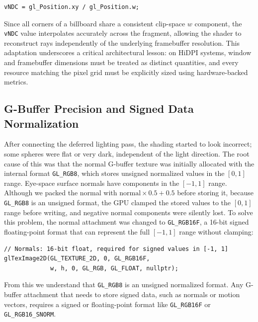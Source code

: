 \documentclass[12pt, a4paper]{article}
\begin{document}
\begin{lstlisting}[style=glslstyle]
vNDC = gl_Position.xy / gl_Position.w;
\end{lstlisting}

Since all corners of a billboard share a consistent clip-space $w$ component, the \texttt{vNDC} value interpolates accurately across the fragment, allowing the shader to reconstruct rays independently of the underlying framebuffer resolution. This adaptation underscores a critical architectural lesson: on HiDPI systems, window and framebuffer dimensions must be treated as distinct quantities, and every resource matching the pixel grid must be explicitly sized using hardware-backed metrics.
\subsection{G-Buffer Precision and Signed Data Normalization}

After connecting the deferred lighting pass, the shading started to look incorrect; some spheres were flat or very dark, independent of the light direction. The root cause of this was that the normal G-buffer texture was initially allocated with the internal format \texttt{GL\_RGB8}, which stores unsigned normalized values in the $[0, 1]$ range. Eye-space surface normals have components in the $[-1, 1]$ range. Although we packed the normal with $\text{normal} \times 0.5 + 0.5$ before storing it, because \texttt{GL\_RGB8} is an unsigned format, the GPU clamped the stored values to the $[0, 1]$ range before writing, and negative normal components were silently lost. To solve this problem, the normal attachment was changed to \texttt{GL\_RGB16F}, a 16-bit signed floating-point format that can represent the full $[-1, 1]$ range without clamping:

\begin{lstlisting}[style=cppstyle]
// Normals: 16-bit float, required for signed values in [-1, 1]
glTexImage2D(GL_TEXTURE_2D, 0, GL_RGB16F,
             w, h, 0, GL_RGB, GL_FLOAT, nullptr);
\end{lstlisting}

From this we understand that \texttt{GL\_RGB8} is an unsigned normalized format. Any G-buffer attachment that needs to store signed data, such as normals or motion vectors, requires a signed or floating-point format like \texttt{GL\_RGB16F} or \texttt{GL\_RGB16\_SNORM}.
\end{document}
